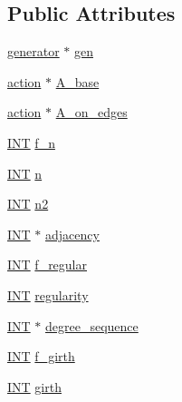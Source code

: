\subsection*{Public Attributes}
\begin{DoxyCompactItemize}
\item 
\mbox{\hyperlink{classgenerator}{generator}} $\ast$ \mbox{\hyperlink{classgraph__generator_a2f216a3b5c31d333c1bf142ec45cf9b8}{gen}}
\item 
\mbox{\hyperlink{classaction}{action}} $\ast$ \mbox{\hyperlink{classgraph__generator_ac9a145114c80793e4478c23952a56e77}{A\+\_\+base}}
\item 
\mbox{\hyperlink{classaction}{action}} $\ast$ \mbox{\hyperlink{classgraph__generator_a3e6330a8c82b67456ab80bca2083e777}{A\+\_\+on\+\_\+edges}}
\item 
\mbox{\hyperlink{galois_8h_a09fddde158a3a20bd2dcadb609de11dc}{I\+NT}} \mbox{\hyperlink{classgraph__generator_a2d557ac17d2b926d616549f330653cf4}{f\+\_\+n}}
\item 
\mbox{\hyperlink{galois_8h_a09fddde158a3a20bd2dcadb609de11dc}{I\+NT}} \mbox{\hyperlink{classgraph__generator_a547dd2f52326933133a3203b979a950f}{n}}
\item 
\mbox{\hyperlink{galois_8h_a09fddde158a3a20bd2dcadb609de11dc}{I\+NT}} \mbox{\hyperlink{classgraph__generator_a1c891bb7323804184a4915bb9dad2bfd}{n2}}
\item 
\mbox{\hyperlink{galois_8h_a09fddde158a3a20bd2dcadb609de11dc}{I\+NT}} $\ast$ \mbox{\hyperlink{classgraph__generator_af8818fa7166a5deafc7867c9c1cd72b3}{adjacency}}
\item 
\mbox{\hyperlink{galois_8h_a09fddde158a3a20bd2dcadb609de11dc}{I\+NT}} \mbox{\hyperlink{classgraph__generator_a9812a96b89ad1176fb0f91ae32b846de}{f\+\_\+regular}}
\item 
\mbox{\hyperlink{galois_8h_a09fddde158a3a20bd2dcadb609de11dc}{I\+NT}} \mbox{\hyperlink{classgraph__generator_a90a9b365508cd30ed4b9bccf034ee57f}{regularity}}
\item 
\mbox{\hyperlink{galois_8h_a09fddde158a3a20bd2dcadb609de11dc}{I\+NT}} $\ast$ \mbox{\hyperlink{classgraph__generator_a1f33137f08eca27f69c9699149ff72c2}{degree\+\_\+sequence}}
\item 
\mbox{\hyperlink{galois_8h_a09fddde158a3a20bd2dcadb609de11dc}{I\+NT}} \mbox{\hyperlink{classgraph__generator_ae3b6c28fdcfe546dc7fd000e8906a293}{f\+\_\+girth}}
\item 
\mbox{\hyperlink{galois_8h_a09fddde158a3a20bd2dcadb609de11dc}{I\+NT}} \mbox{\hyperlink{classgraph__generator_a84adfe0d962dde81a0beb82a600ae54e}{girth}}

\end{DoxyCompactItemize}
